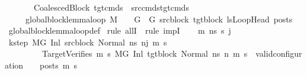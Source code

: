 \begin{isabellebody}
\ \ \ \ \ \ \ CoalescedBlock{\isacharcolon}{\kern0pt}\ {\isachardoublequoteopen}tgt{\isacharunderscore}{\kern0pt}cmds\ {\isacharequal}{\kern0pt}\ src{\isacharunderscore}{\kern0pt}cmds{\isacharat}{\kern0pt}tgt{\isacharunderscore}{\kern0pt}cmds{\isacharunderscore}{\kern0pt}{}{\isachardoublequoteclose}\isanewline
\ \ \ \ \ {\isachardoublequoteopen}global{\isacharunderscore}{\kern0pt}block{\isacharunderscore}{\kern0pt}lemma{\isacharunderscore}{\kern0pt}loop\ M\ {\isasymLambda}\ {\isasymGamma}\ {\isasymOmega}\ G\ \ G{\isacharprime}{\kern0pt}\ src{\isacharunderscore}{\kern0pt}block\ tgt{\isacharunderscore}{\kern0pt}block\ lsLoopHead\ posts{\isachardoublequoteclose}\isanewline
%
\isadelimproof
\ \ %
\endisadelimproof
%
\isatagproof
{}\isamarkupfalse%
\ global{\isacharunderscore}{\kern0pt}block{\isacharunderscore}{\kern0pt}lemma{\isacharunderscore}{\kern0pt}loop{\isacharunderscore}{\kern0pt}def\isanewline
{}\isamarkupfalse%
\ {\isacharparenleft}{\kern0pt}rule\ allI\ {\isacharbar}{\kern0pt}\ rule\ impI{\isacharparenright}{\kern0pt}{\isacharplus}{\kern0pt}\isanewline
\ \ \isamarkupfalse%
\ m{\isacharprime}{\kern0pt}\ ns\ s{\isacharprime}{\kern0pt}\ j\isanewline
\ \ \isamarkupfalse%
\ k{\isacharunderscore}{\kern0pt}step{\isacharcolon}{\kern0pt}\ {\isachardoublequoteopen}M{\isacharcomma}{\kern0pt}{\isasymLambda}{\isacharcomma}{\kern0pt}{\isasymGamma}{\isacharcomma}{\kern0pt}{\isasymOmega}{\isacharcomma}{\kern0pt}G\ {\isasymturnstile}{\isacharparenleft}{\kern0pt}Inl\ src{\isacharunderscore}{\kern0pt}block{\isacharcomma}{\kern0pt}\ Normal\ ns{\isacharparenright}{\kern0pt}\ {\isacharminus}{\kern0pt}n{\isasymrightarrow}{\isacharcircum}{\kern0pt}j\ {\isacharparenleft}{\kern0pt}m{\isacharprime}{\kern0pt}{\isacharcomma}{\kern0pt}\ s{\isacharprime}{\kern0pt}{\isacharparenright}{\kern0pt}{\isachardoublequoteclose}\ \isanewline
\ \ \ \ \ \ \ \ \ TargetVerifies{\isacharcolon}{\kern0pt}\ {\isachardoublequoteopen}{\isasymforall}m{}{\isacharprime}{\kern0pt}\ s{}{\isacharprime}{\kern0pt}{\isachardot}{\kern0pt}\ {\isacharparenleft}{\kern0pt}M{\isacharcomma}{\kern0pt}{\isasymLambda}{\isacharcomma}{\kern0pt}{\isasymGamma}{\isacharcomma}{\kern0pt}{\isasymOmega}{\isacharcomma}{\kern0pt}G{\isacharprime}{\kern0pt}\ {\isasymturnstile}{\isacharparenleft}{\kern0pt}Inl\ tgt{\isacharunderscore}{\kern0pt}block{\isacharcomma}{\kern0pt}\ Normal\ ns{\isacharparenright}{\kern0pt}\ {\isacharminus}{\kern0pt}n{\isasymrightarrow}{\isacharasterisk}{\kern0pt}\ {\isacharparenleft}{\kern0pt}m{}{\isacharprime}{\kern0pt}{\isacharcomma}{\kern0pt}\ s{}{\isacharprime}{\kern0pt}{\isacharparenright}{\kern0pt}{\isacharparenright}{\kern0pt}\ {\isasymlongrightarrow}\ valid{\isacharunderscore}{\kern0pt}configuration\ {\isasymLambda}\ {\isasymGamma}\ {\isasymOmega}\ posts\ m{}{\isacharprime}{\kern0pt}\ s{}{\isacharprime}{\kern0pt}{\isachardoublequoteclose}\ \isanewline

\end{isabellebody}
